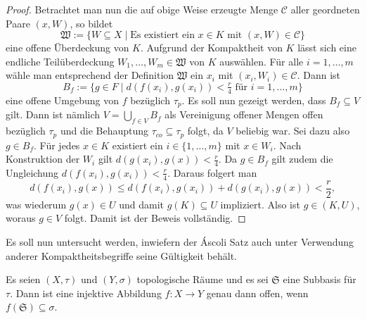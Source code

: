 \begin{proof}
  Betrachtet man nun die auf obige Weise erzeugte Menge $\mathcal{C}$ aller geordneten Paare $(x,W)$, so bildet
  \begin{displaymath}
    \mathfrak{W} := \{W \subseteq X \mid \text{Es existiert ein $x \in K$ mit $(x,W) \in \mathcal{C}$} \}
  \end{displaymath}
  eine offene Überdeckung von $K$.
  Aufgrund der Kompaktheit von $K$ lässt sich eine endliche Teilüberdeckung $W_1,\dots,W_m \in \mathfrak{W}$ von $K$ auswählen.
  Für alle $i = 1,\dots,m$ wähle man entsprechend der Definition $\mathfrak{W}$ ein $x_i$ mit $(x_i,W_i) \in \mathcal{C}$.
  Dann ist
  \begin{displaymath}
    B_f := \{ g \in F \mid d(f(x_i),g(x_i)) < \tfrac{r}{4} \text{ für } i = 1,\dots,m\}
  \end{displaymath}
  eine offene Umgebung von $f$ bezüglich $\tau_p$.
  Es soll nun gezeigt werden, dass $B_f \subseteq V$ gilt.
  Dann ist nämlich $V = \bigcup_{f \in V} B_f$ als Vereinigung offener Mengen offen bezüglich $\tau_p$ und die Behauptung $\tau_{co} \subseteq \tau_p$ folgt, da $V$ beliebig war.
  Sei dazu also $g \in B_f$.
  Für jedes $x \in K$ existiert ein $i \in \{1,\dots,m\}$ mit $x \in W_i$.
  Nach Konstruktion der $W_i$ gilt $d(g(x_i),g(x)) < \tfrac{r}{4}$.
  Da $g \in B_f$ gilt zudem die Ungleichung $d(f(x_i),g(x_i)) < \tfrac{r}{4}$.
  Daraus folgert man
  \begin{displaymath}
    d(f(x_i),g(x)) \leq d(f(x_i),g(x_i)) + d(g(x_i),g(x)) < \frac{r}{2},
  \end{displaymath}
  was wiederum $g(x) \in U$ und damit $g(K) \subseteq U$ impliziert. 
  Also ist $g \in (K,U)$, woraus $g \in V$ folgt.
  Damit ist der Beweis vollständig.
\end{proof}

Es soll nun untersucht werden, inwiefern der Áscoli Satz auch unter Verwendung anderer Kompaktheitsbegriffe seine Gültigkeit behält.

\begin{lem}
  \label{lem:openmap}
  Es seien $(X,\tau)$ und $(Y,\sigma)$ topologische Räume und es sei $\mathfrak{S}$ eine Subbasis für $\tau$.  
  Dann ist eine injektive Abbildung $f \colon X \to Y$ genau dann offen, wenn $f(\mathfrak{S}) \subseteq \sigma$.
\end{lem}


